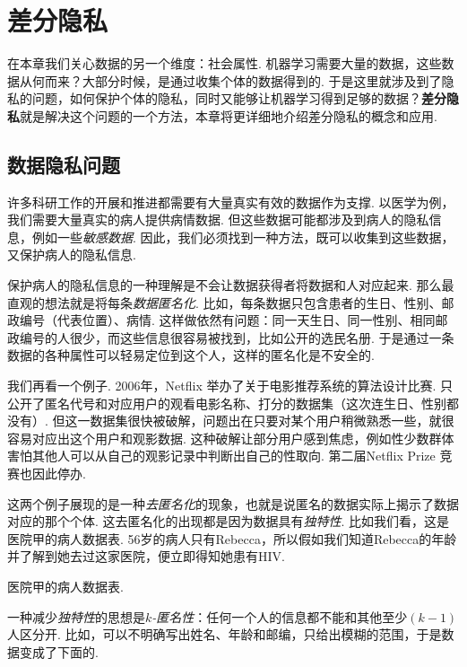 \chapter{差分隐私}\label{chap:differential-privacy}
\begingroup
\newcommand{\pref}{Chapters/differential-privacy/figures}

在本章我们关心数据的另一个维度：社会属性. 机器学习需要大量的数据，这些数据从何而来？大部分时候，是通过收集个体的数据得到的. 于是这里就涉及到了隐私的问题，如何保护个体的隐私，同时又能够让机器学习得到足够的数据？\textbf{差分隐私}就是解决这个问题的一个方法，本章将更详细地介绍差分隐私的概念和应用. 

\section{数据隐私问题}

许多科研工作的开展和推进都需要有大量真实有效的数据作为支撑. 以医学为例，我们需要大量真实的病人提供病情数据. 但这些数据可能都涉及到病人的隐私信息，例如一些\emph{敏感数据}. 因此，我们必须找到一种方法，既可以收集到这些数据，又保护病人的隐私信息.

保护病人的隐私信息的一种理解是不会让数据获得者将数据和人对应起来. 那么最直观的想法就是将每条\emph{数据匿名化}. 比如，每条数据只包含患者的生日、性别、邮政编号（代表位置）、病情. 这样做依然有问题：同一天生日、同一性别、相同邮政编号的人很少，而这些信息很容易被找到，比如公开的选民名册. 于是通过一条数据的各种属性可以轻易定位到这个人，这样的匿名化是不安全的.

我们再看一个例子. 2006年，Netflix 举办了关于电影推荐系统的算法设计比赛.
只公开了匿名代号和对应用户的观看电影名称、打分的数据集（这次连生日、性别都没有）. 但这一数据集很快被破解，问题出在只要对某个用户稍微熟悉一些，就很容易对应出这个用户和观影数据. 这种破解让部分用户感到焦虑，例如性少数群体害怕其他人可以从自己的观影记录中判断出自己的性取向. 第二届Netflix Prize 竞赛也因此停办.

这两个例子展现的是一种\emph{去匿名化}的现象，也就是说匿名的数据实际上揭示了数据对应的那个个体. 这去匿名化的出现都是因为数据具有\emph{独特性}. 比如我们看，这是医院甲的病人数据表. 56岁的病人只有Rebecca，所以假如我们知道Rebecca的年龄并了解到她去过这家医院，便立即得知她患有HIV.

\begin{table}[!ht]
\centering

\caption{医院甲的病人数据表. }
\label{tab:tab01}
\end{table}

一种减少\emph{独特性}的思想是\emph{$k$-匿名性}：任何一个人的信息都不能和其他至少$(k-1)$人区分开. 比如，可以不明确写出姓名、年龄和邮编，只给出模糊的范围，于是数据变成了下面的.

